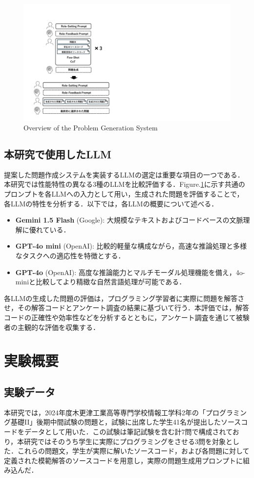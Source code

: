 \documentclass[twocolumn, fleqn, uplatex]{jsarticle}
\begin{document}
\begin{figure}
    \centering
    \includegraphics[width=1.0\linewidth]{figure/archtecture_figure_short_tlim.pdf}
    \caption{Overview of the Problem Generation System}
    \label{fig:system_overview}
\end{figure}

\subsection{本研究で使用したLLM}
提案した問題作成システムを実装するLLMの選定は重要な項目の一つである．本研究では性能特性の異なる3種のLLMを比較評価する．Figure.\ref{fig:system_overview}に示す共通のプロンプトを各LLMへの入力として用い，生成された問題を評価することで，各LLMの特性を分析する．以下では，各LLMの概要について述べる．
\begin{itemize}
\item \textbf{Gemini 1.5 Flash} (Google): 大規模なテキストおよびコードベースの文脈理解に優れている．
\item \textbf{GPT-4o mini} (OpenAI): 比較的軽量な構成ながら，高速な推論処理と多様なタスクへの適応性を特徴とする．
\item \textbf{GPT-4o} (OpenAI): 高度な推論能力とマルチモーダル処理機能を備え，4o-miniと比較してより精緻な自然言語処理が可能である．
\end{itemize}
各LLMの生成した問題の評価は，プログラミング学習者に実際に問題を解答させ，その解答コードとアンケート調査の結果に基づいて行う．本評価では，解答コードの正確性や効率性などを分析するとともに，アンケート調査を通じて被験者の主観的な評価を収集する．


\section{実験概要}
\subsection{実験データ}
本研究では，2024年度木更津工業高等専門学校情報工学科2年の「プログラミング基礎II」後期中間試験の問題と，試験に出席した学生41名が提出したソースコードをデータとして用いた．この試験は筆記試験を含む計7問で構成されており，本研究ではそのうち学生に実際にプログラミングをさせる3問を対象とした．これらの問題文，学生が実際に解いたソースコード，および各問題に対して定義された模範解答のソースコードを用意し，実際の問題生成用プロンプトに組み込んだ．
\end{document}
